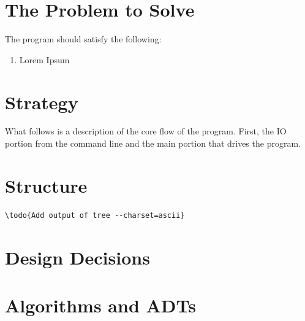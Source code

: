 \documentclass[10pt,letterpaper,final]{report}
\begin{document}
\tableofcontents

\pagebreak

\section{The Problem to Solve}

The program should satisfy the following:

\begin{enumerate}
  \item Lorem Ipsum
\end{enumerate}

\section{Strategy}\label{sec:strategy}


What follows is a description of the core flow of the program. First, the IO portion from the command line and the main portion that drives the program.



\clearpage\pagebreak

\section{Structure}\label{sec:structure}

\begin{verbatim}
\todo{Add output of tree --charset=ascii}
\end{verbatim}

\section{Design Decisions}



\section{Algorithms and ADTs}
\end{document}
